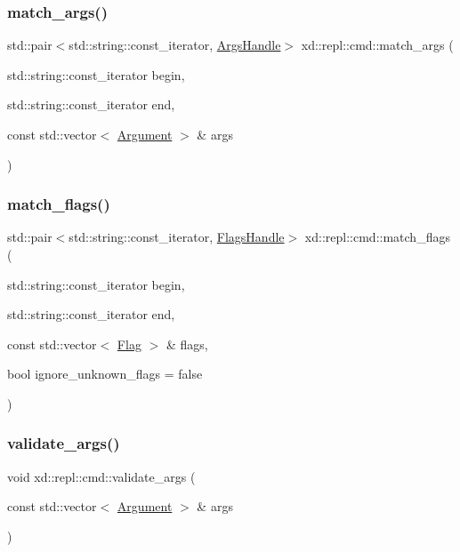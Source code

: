 \subsubsection{\texorpdfstring{match\+\_\+args()}{match\_args()}}
{\footnotesize\ttfamily std\+::pair$<$std\+::string\+::const\+\_\+iterator, \mbox{\hyperlink{classxd_1_1repl_1_1cmd_1_1_args_handle}{Args\+Handle}}$>$ xd\+::repl\+::cmd\+::match\+\_\+args (\begin{DoxyParamCaption}\item[{std\+::string\+::const\+\_\+iterator}]{begin,  }\item[{std\+::string\+::const\+\_\+iterator}]{end,  }\item[{const std\+::vector$<$ \mbox{\hyperlink{classxd_1_1repl_1_1cmd_1_1_argument}{Argument}} $>$ \&}]{args }\end{DoxyParamCaption})}

\mbox{\label{namespacexd_1_1repl_1_1cmd_adc340024a2d8596b7e9c0a7bb2bbdc35}} 
\subsubsection{\texorpdfstring{match\+\_\+flags()}{match\_flags()}}
{\footnotesize\ttfamily std\+::pair$<$std\+::string\+::const\+\_\+iterator, \mbox{\hyperlink{classxd_1_1repl_1_1cmd_1_1_flags_handle}{Flags\+Handle}}$>$ xd\+::repl\+::cmd\+::match\+\_\+flags (\begin{DoxyParamCaption}\item[{std\+::string\+::const\+\_\+iterator}]{begin,  }\item[{std\+::string\+::const\+\_\+iterator}]{end,  }\item[{const std\+::vector$<$ \mbox{\hyperlink{classxd_1_1repl_1_1cmd_1_1_flag}{Flag}} $>$ \&}]{flags,  }\item[{bool}]{ignore\+\_\+unknown\+\_\+flags = {\ttfamily false} }\end{DoxyParamCaption})}

\mbox{\label{namespacexd_1_1repl_1_1cmd_aa5d4e3633aec5329d5533af2c8bce490}} 
\subsubsection{\texorpdfstring{validate\+\_\+args()}{validate\_args()}}
{\footnotesize\ttfamily void xd\+::repl\+::cmd\+::validate\+\_\+args (\begin{DoxyParamCaption}\item[{const std\+::vector$<$ \mbox{\hyperlink{classxd_1_1repl_1_1cmd_1_1_argument}{Argument}} $>$ \&}]{args }\end{DoxyParamCaption})}

